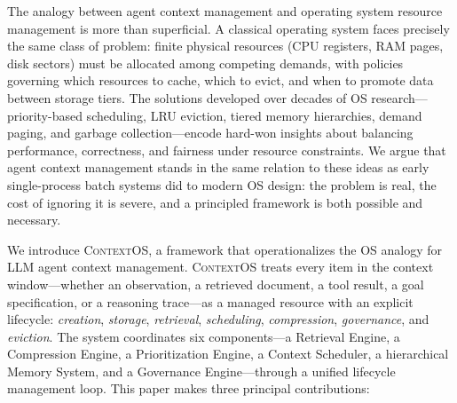\documentclass[review,12pt]{elsarticle}
\newcommand{\contextos}{\textsc{ContextOS}}
\begin{document}
The analogy between agent context management and operating system resource
management is more than superficial.  A classical operating system faces
precisely the same class of problem: finite physical resources (CPU registers,
RAM pages, disk sectors) must be allocated among competing demands, with
policies governing which resources to cache, which to evict, and when to
promote data between storage tiers.  The solutions developed over decades of
OS research—priority-based scheduling, LRU eviction, tiered memory hierarchies,
demand paging, and garbage collection—encode hard-won insights about balancing
performance, correctness, and fairness under resource constraints.  We argue
that agent context management stands in the same relation to these ideas as
early single-process batch systems did to modern OS design: the problem is real,
the cost of ignoring it is severe, and a principled framework is both possible
and necessary.

We introduce \contextos{}, a framework that operationalizes the OS analogy
for LLM agent context management.  \contextos{} treats every item in the context
window—whether an observation, a retrieved document, a tool result, a goal
specification, or a reasoning trace—as a managed resource with an explicit
lifecycle: \emph{creation}, \emph{storage}, \emph{retrieval}, \emph{scheduling},
\emph{compression}, \emph{governance}, and \emph{eviction}.  The system
coordinates six components—a Retrieval Engine, a Compression Engine, a
Prioritization Engine, a Context Scheduler, a hierarchical Memory System, and a
Governance Engine—through a unified lifecycle management loop.  This paper
makes three principal contributions:
\end{document}
